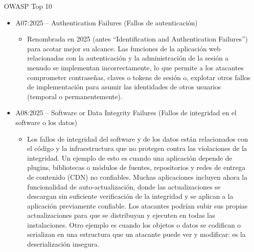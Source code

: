 \documentclass[aspectratio=169,10pt]{beamer}
\begin{document}
\begin{frame}[allowframebreaks]{OWASP Top 10}
\small
  \begin{itemize}
  \item A07:2025 -- Authentication Failures (Fallos de autenticación)
      \begin{itemize}

  \item Renombrada en 2025 (antes ``Identification and Authentication Failures'') para acotar mejor su alcance. Las funciones de la aplicación web relacionadas con la autenticación y la administración de la sesión a menudo se implementan incorrectamente, lo que permite a los atacantes comprometer contraseñas, claves o tokens de sesión o, explotar otros fallos de implementación para asumir las identidades de otros usuarios (temporal o permanentemente).
  \end{itemize}

  \item A08:2025 -- Software or Data Integrity Failures (Fallos de integridad en el software o los datos)
      \begin{itemize}

  \item Los fallos de integridad del software y de los datos están relacionados con el código y la infraestructura que no protegen contra las violaciones de la integridad. Un ejemplo de esto es cuando una aplicación depende de plugins, bibliotecas o módulos de fuentes, repositorios y redes de entrega de contenido (CDN) no confiables. Muchas aplicaciones incluyen ahora la funcionalidad de auto-actualización, donde las actualizaciones se descargan sin suficiente verificación de la integridad y se aplican a la aplicación previamente confiable. Los atacantes podrían subir sus propias actualizaciones para que se distribuyan y ejecuten en todas las instalaciones. Otro ejemplo es cuando los objetos o datos se codifican o serializan en una estructura que un atacante puede ver y modificar: es la deserialización insegura.
  \end{itemize}
  \end{itemize}

\end{frame}
\end{document}
